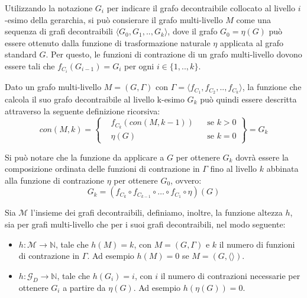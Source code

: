     Utilizzando la notazione $G_i$ per indicare il grafo decontraibile collocato al livello $i$-esimo della gerarchia,
    si pu\`o consierare il grafo multi-livello $M$ come una sequenza di grafi decontraibili
    $\langle G_0, G_1, .., G_k \rangle$, dove il grafo $G_0 = \eta(G)$ pu\`o essere ottenuto dalla funzione di
    trasformazione naturale $\eta$ applicata al grafo standard $G$.
    Per questo, le funzioni di contrazione di un grafo multi-livello dovono essere tali che
    $f_{C_i}(G_{i-1}) = G_i$ per ogni $i \in \{1, .., k\}$. \newline

    Dato un grafo multi-livello $M = (G,\Gamma)$ con $\Gamma = \langle f_{C_1}, f_{C_2}, .., f_{C_k} \rangle$,
    la funzione che calcola il suo grafo decontraibile al livello k-esimo $G_k$ pu\`o quindi essere descritta
    attraverso la seguente definizione ricorsiva: \newline
    \begin{equation*}
        con(M, k) =
        \left\{
        \begin{aligned}
            &f_{C_k}(con(M, k-1)) && \text{se } k > 0\\
            &\eta(G)  && \text{se } k = 0
        \end{aligned}
        \right\}
        = G_k
    \end{equation*} \newline

    Si pu\`o notare che la funzione da applicare a $G$ per ottenere $G_{k}$ dovr\`a essere la composizione ordinata
    delle funzioni di contrazione in $\Gamma$ fino al livello $k$ abbinata alla funzione di contrazione $\eta$ per
    ottenere $G_0$, ovvero:
    \begin{equation*}
        G_k = (f_{C_k} \circ f_{C_{k-1}} \circ \ldots \circ f_{C_1} \circ \eta)(G)
    \end{equation*}

    Sia $\mathcal{M}$ l'insieme dei grafi decontraibili, definiamo, inoltre, la funzione altezza $h$, sia
    per grafi multi-livello che per i suoi grafi decontraibili, nel modo seguente:

    \begin{itemize}
        \item $h : \mathcal{M} \rightarrow \mathbb{N}$, tale che $h(M) = k$, con $M = (G, \Gamma)$ e $k$ il numero di
        funzioni di contrazione in $\Gamma$. Ad esempio $h(M) = 0$ se $M = (G, \langle \rangle)$.
        \item $h : \mathcal{G}_D \rightarrow \mathbb{N}$, tale che $h(G_i) = i$, con $i$ il numero di contrazioni
        necessarie per ottenere $G_i$ a partire da $\eta(G)$. Ad esempio $h(\eta(G)) = 0$.
    \end{itemize}

